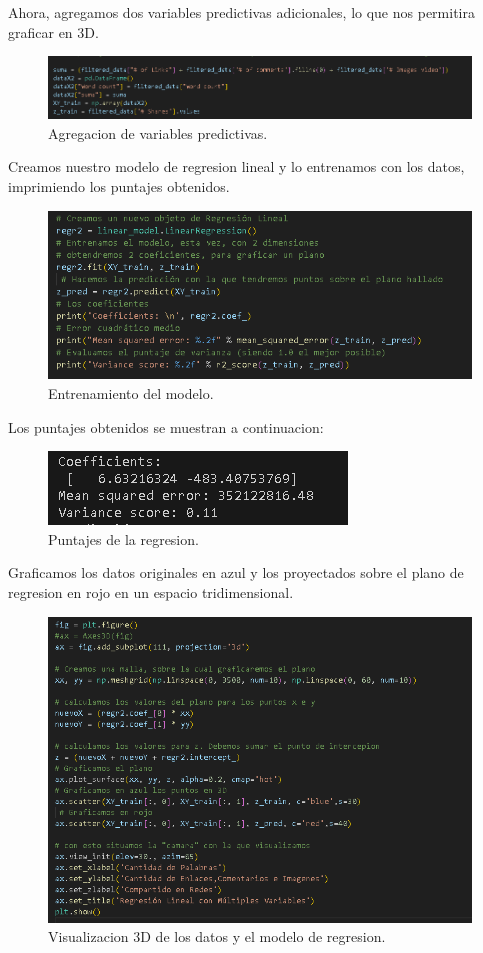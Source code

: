 \documentclass{article}
\begin{document}
Ahora, agregamos dos variables predictivas adicionales, lo que nos permitira graficar en 3D.

\begin{figure}[H]
    \centering
    \includegraphics[width=0.8\linewidth]{img/2.png}
    \caption{Agregacion de variables predictivas.}
\end{figure}

Creamos nuestro modelo de regresion lineal y lo entrenamos con los datos, imprimiendo los puntajes obtenidos.

\begin{figure}[H]
    \centering
    \includegraphics[width=0.8\linewidth]{img/3.png}
    \caption{Entrenamiento del modelo.}
\end{figure}

Los puntajes obtenidos se muestran a continuacion:

\begin{figure}[H]
    \centering
    \includegraphics[width=0.8\linewidth]{img/4.png}
    \caption{Puntajes de la regresion.}
\end{figure}

Graficamos los datos originales en azul y los proyectados sobre el plano de regresion en rojo en un espacio tridimensional.

\begin{figure}[H]
    \centering
    \includegraphics[width=0.8\linewidth]{img/5.png}
    \caption{Visualizacion 3D de los datos y el modelo de regresion.}
\end{figure}
\end{document}
